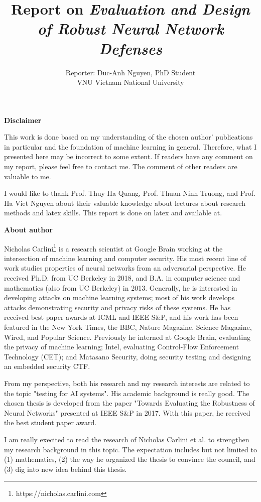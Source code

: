 \documentclass[12pt]{article}
\title{Report on \textit{Evaluation and Design of Robust Neural Network Defenses}}
\author{Reporter: Duc-Anh Nguyen, PhD Student\\VNU Vietnam National University}
\date{}
\begin{document}
\maketitle

\newpage
\begin{center}
	\textbf{Disclaimer}
\end{center}
This work is done based on my understanding of the chosen author' publications in particular and the foundation of machine learning in general. Therefore, what I presented here may be incorrect to some extent. If readers have any comment on my report, please feel free to contact me. The comment of other readers are valuable to me.

I would like to thank Prof. Thuy Ha Quang, Prof. Thuan Ninh Truong, and Prof. Ha Viet Nguyen about their valuable knowledge about lectures about research methods and latex skills. This report is done on latex and available at.

\newpage
\begin{center}
	\textbf{About author}
\end{center}

Nicholas Carlini\footnote{https://nicholas.carlini.com} is a research scientist at Google Brain working at the intersection of machine learning and computer security. His most recent line of work studies properties of neural networks from an adversarial perspective. He received Ph.D. from UC Berkeley in 2018, and B.A. in computer science and mathematics (also from UC Berkeley) in 2013. 
Generally, he is interested in developing attacks on machine learning systems; most of his work develops attacks demonstrating security and privacy risks of these systems. He has received best paper awards at ICML and IEEE S\&P, and his work has been featured in the New York Times, the BBC, Nature Magazine, Science Magazine, Wired, and Popular Science. 
Previously he interned at Google Brain, evaluating the privacy of machine learning; Intel, evaluating Control-Flow Enforcement Technology (CET); and Matasano Security, doing security testing and designing an embedded security CTF.

From my perspective, both his research and my research interests are related to the topic "testing for AI systems". His academic background is really good. The chosen thesis is developed from the paper "Towards Evaluating the Robustness of Neural Networks" presented at IEEE S\&P in 2017. With this paper, he received the best student paper award.

I am really execited to read the research of Nicholas Carlini et al. to strengthen my research background in this topic. The expectation includes but not limited to (1) mathematics, (2) the way he organized the thesis to convince the council, and (3) dig into new idea behind this thesis.
\end{document}
